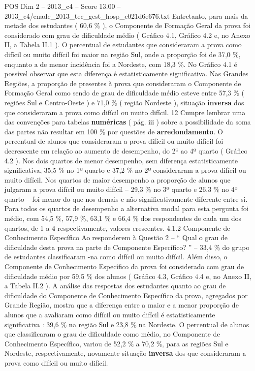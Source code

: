 \begin{textsample}{POS Dim 2 – 2013\_c4 – Score 13.00 – 2013\_c4/enade\_2013\_tec\_gest\_hosp\_e021d6e676.txt}
Entretanto, para mais da metade dos estudantes ( 60,6 \% ), o Componente de Formação Geral da prova foi considerado com grau de dificuldade médio ( Gráfico 4.1, Gráfico 4.2 e, no Anexo II, a Tabela II.1 ).
O percentual de estudantes que consideraram a prova como difícil ou muito difícil foi maior na região Sul, onde a proporção foi de 37,0 \%, enquanto a de menor incidência foi a Nordeste, com 18,3 \%.
No Gráfico 4.1 é possível observar que esta diferença é estatisticamente significativa.
Nas Grandes Regiões, a proporção de presentes à prova que consideraram o Componente de Formação Geral como sendo de grau de dificuldade médio esteve entre 57,3 \% ( regiões Sul e Centro-Oeste ) e 71,0 \% ( região Nordeste ), situação \textbf{inversa} dos que consideraram a prova como difícil ou muito difícil. 12 Cumpre lembrar uma das convenções para tabelas \textbf{numéricas} ( pág. iii ) sobre a possibilidade da soma das partes não resultar em 100 \% por questões de \textbf{arredondamento}.
O percentual de alunos que consideraram a prova difícil ou muito difícil foi decrescente em relação ao aumento de desempenho, do 2º ao 4º quarto ( Gráfico 4.2 ).
Nos dois quartos de menor desempenho, sem diferença estatisticamente significativa, 35,5 \% no 1º quarto e 37,2 \% no 2º consideraram a prova difícil ou muito difícil.
Nos quartos de maior desempenho a proporção de alunos que julgaram a prova difícil ou muito difícil – 29,3 \% no 3º quarto e 26,3 \% no 4º quarto – foi menor do que nos demais e não significativamente diferente entre si.
Para todos os quartos de desempenho a alternativa modal para esta pergunta foi médio, com 54,5 \%, 57,9 \%, 63,1 \% e 66,4 \% dos respondentes de cada um dos quartos, de 1 a 4 respectivamente, valores crescentes. 4.1.2 Componente de Conhecimento Específico Ao responderem à Questão 2 – “ Qual o grau de dificuldade desta prova na parte de Componente Específico? ” – 33,4 \% do grupo de estudantes classificaram -na como difícil ou muito difícil.
Além disso, o Componente de Conhecimento Específico da prova foi considerado com grau de dificuldade médio por 59,5 \% dos alunos ( Gráfico 4.3, Gráfico 4.4 e, no Anexo II, a Tabela II.2 ).
A análise das respostas dos estudantes quanto ao grau de dificuldade do Componente de Conhecimento Específico da prova, agregados por Grande Região, mostra que a diferença entre a maior e a menor proporção de alunos que a avaliaram como difícil ou muito difícil é estatisticamente significativa : 39,6 \% na região Sul e 23,8 \% na Nordeste.
O percentual de alunos que classificaram o grau de dificuldade como médio, no Componente de Conhecimento Específico, variou de 52,2 \% a 70,2 \%, para as regiões Sul e Nordeste, respectivamente, novamente situação \textbf{inversa} dos que consideraram a prova como difícil ou muito difícil.

\end{textsample}
